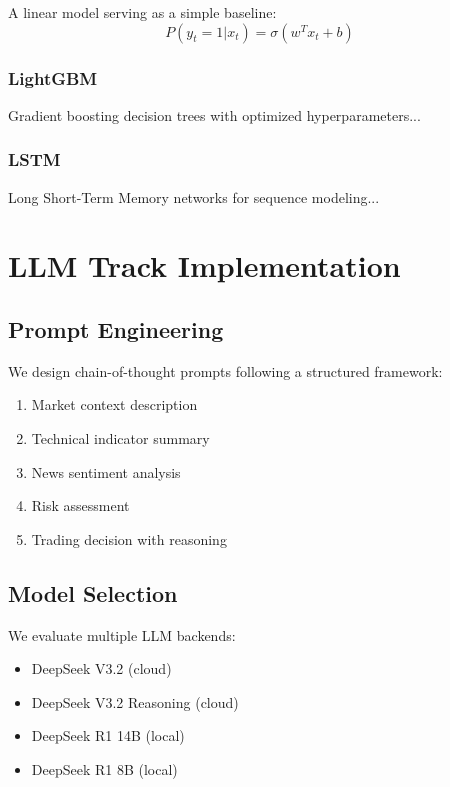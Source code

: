 A linear model serving as a simple baseline:
\begin{equation}
P(y_t=1|x_t) = \sigma(w^T x_t + b)
\end{equation}

\subsubsection{LightGBM}

Gradient boosting decision trees \cite{ke2017lightgbm} with optimized hyperparameters...

\subsubsection{LSTM}

Long Short-Term Memory networks \cite{hochreiter1997lstm} for sequence modeling...

\section{LLM Track Implementation}

\subsection{Prompt Engineering}

We design chain-of-thought prompts following a structured framework:

\begin{enumerate}
    \item Market context description
    \item Technical indicator summary
    \item News sentiment analysis
    \item Risk assessment
    \item Trading decision with reasoning
\end{enumerate}

\subsection{Model Selection}

We evaluate multiple LLM backends:

\begin{itemize}
    \item DeepSeek V3.2 (cloud)
    \item DeepSeek V3.2 Reasoning (cloud)
    \item DeepSeek R1 14B (local)
    \item DeepSeek R1 8B (local)
\end{itemize}

